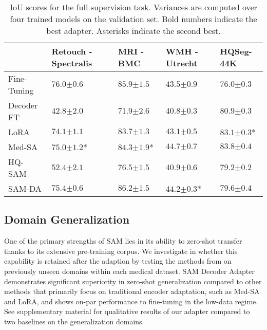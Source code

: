 \begin{table*}
\caption{IoU scores for the full supervision task. Variances are computed over four trained models on the validation set. Bold numbers indicate the best adapter. Asterisks indicate the second best.\label{tab:supervised_training}}
\centering
\begin{tabular}{@{}lP{3.3cm}P{2.5cm}P{2.5cm}P{2.5cm}@{}}
\toprule
  & Retouch - Spectralis & MRI - BMC & WMH - Utrecht & HQSeg-44K  \\ \midrule
Fine-Tuning &  $76.0{\scriptscriptstyle \pm 0.6}$ & $85.9{\scriptscriptstyle \pm 1.5}$ & $43.5{\scriptscriptstyle \pm 0.9}$ & $76.0{\scriptscriptstyle \pm 0.3}$  \\ \midrule
Decoder FT  & $42.8{\scriptscriptstyle \pm 2.0}$ & $71.9{\scriptscriptstyle \pm 2.6}$ & $40.8{\scriptscriptstyle \pm 0.3}$ & $80.9{\scriptscriptstyle \pm 0.3}$  \\
LoRA~\cite{hu2022lora} & $74.1{\scriptscriptstyle \pm 1.1}$ & $83.7{\scriptscriptstyle \pm 1.3}$ & $43.1{\scriptscriptstyle \pm 0.5}$ & $83.1{\scriptscriptstyle \pm 0.3}$*  \\
Med-SA~\cite{wu2023medical}  & $75.0{\scriptscriptstyle \pm 1.2}$* & $84.3{\scriptscriptstyle \pm 1.9}$* & $\mathbf{44.7}{\scriptscriptstyle \pm 0.7}$ & $\mathbf{83.8}{\scriptscriptstyle \pm 0.4}$  \\
HQ-SAM~\cite{ke2024segment}  & $52.4{\scriptscriptstyle \pm 2.1}$ & $76.5{\scriptscriptstyle \pm 1.5}$ & $40.9{\scriptscriptstyle \pm 0.6}$ & $79.2{\scriptscriptstyle \pm 0.2}$  \\ \midrule
SAM-DA  & $\mathbf{75.4}{\scriptscriptstyle \pm 0.6}$ & $\mathbf{86.2}{\scriptscriptstyle \pm 1.5}$ & $44.2{\scriptscriptstyle \pm 0.3}$* & $79.6{\scriptscriptstyle \pm 0.4}$  \\ \bottomrule
\end{tabular}
\end{table*}


%

\subsection{Domain Generalization}
One of the primary strengths of SAM lies in its ability to zero-shot transfer thanks to its extensive pre-training corpus. We investigate in  whether this capability is retained after the adaption by testing the methods from  on previously unseen domains within each medical dataset. SAM Decoder Adapter demonstrates significant superiority in zero-shot generalization compared to other methods that primarily focus on traditional encoder adaptation, such as Med-SA and LoRA, and shows on-par performance to fine-tuning in the low-data regime. See supplementary material for qualitative results of our adapter compared to two baselines on the generalization domains.

